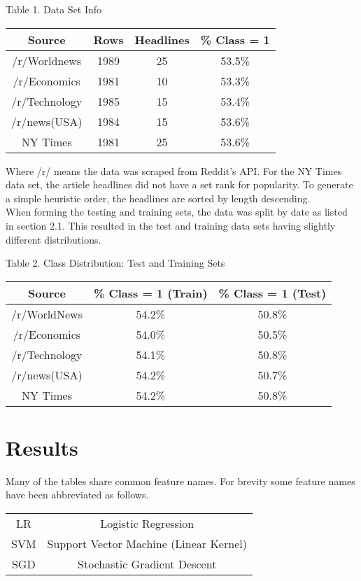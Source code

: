 \documentclass[11pt,a4paper]{article}
\begin{document}
\begin{center}
Table 1. Data Set Info
\begin{tabular}{ |c|c|c|c| }
 \hline
 Source & Rows & \small{Headlines} & \% Class = 1 \\
 \hline
 \small{/r/Worldnews} & 1989 & 25 & 53.5\% \\
 \small{/r/Economics} & 1981 & 10 & 53.3\% \\
 \small{/r/Technology} & 1985 & 15 & 53.4\% \\
 \small{/r/news(USA)} & 1984 & 15 & 53.6\% \\
 \small{ NY Times} & 1981 & 25 & 53.6\% \\
 \hline
\end{tabular}
\end{center}
Where /r/ means the data was scraped from Reddit's API. For the NY Times data set, the article headlines did not have a set rank for popularity. To generate a simple heuristic order, the headlines are sorted by length descending.\\

When forming the testing and training sets, the data was split by date as listed in section 2.1. This resulted in the test and training data sets having slightly different distributions.

\begin{center}
Table 2. Class Distribution: Test and Training Sets
\begin{tabular}{ |c|c|c| }
 \hline
 Source & \% Class = 1 (Train) & \% Class = 1 (Test)\\
 \hline
 /r/WorldNews & 54.2\% & 50.8\% \\
 /r/Economics & 54.0\% & 50.5\% \\
 /r/Technology & 54.1\% & 50.8\% \\
 /r/news(USA)  & 54.2\% & 50.7\% \\
 NY Times  & 54.2\% & 50.8\%  \\
 \hline
\end{tabular}
\end{center}

\section{Results}
Many of the tables share common feature names. For brevity some feature names have been abbreviated as follows.
\begin{center}
\begin{tabular}{c c}
LR & Logistic Regression\\
SVM & Support Vector Machine (Linear Kernel)\\
SGD & Stochastic Gradient Descent
\end{tabular}
\end{center}
\end{document}
